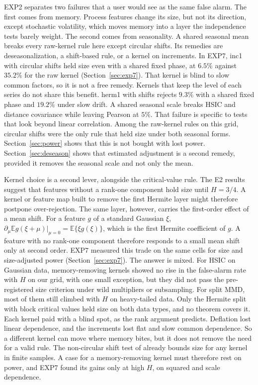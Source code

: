\documentclass[11pt]{article}
\theoremstyle{remark}
\newcommand{\E}{\mathbb E}
\begin{document}
EXP2 separates two failures that a user would see as the same false alarm. The first comes from memory. Process features change its size, but not its direction, except stochastic volatility, which moves memory into a layer the independence tests barely weight. The second comes from seasonality. A shared seasonal mean breaks every raw-kernel rule here except circular shifts. Its remedies are deseasonalization, a shift-based rule, or a kernel on increments. In EXP7, inc1 with circular shifts held size even with a shared fixed phase, at $6.5\%$ against $35.2\%$ for the raw kernel (Section~\ref{sec:exp7}). That kernel is blind to slow common factors, so it is not a free remedy. Kernels that keep the level of each series do not share this benefit. herm1 with shifts rejects $9.3\%$ with a shared fixed phase and $19.2\%$ under slow drift. A shared seasonal scale breaks HSIC and distance covariance while leaving Pearson at $5\%$. That failure is specific to tests that look beyond linear correlation. Among the raw-kernel rules on this grid, circular shifts were the only rule that held size under both seasonal forms. Section~\ref{sec:power} shows that this is not bought with lost power. Section~\ref{sec:deseason} shows that estimated adjustment is a second remedy, provided it removes the seasonal scale and not only the mean.

Kernel choice is a second lever, alongside the critical-value rule. The E2 results suggest that features without a rank-one component hold size until $H=3/4$. A kernel or feature map built to remove the first Hermite layer might therefore postpone over-rejection. The same layer, however, carries the first-order effect of a mean shift. For a feature $g$ of a standard Gaussian $\xi$, $\partial_\mu\E g(\xi+\mu)|_{\mu=0}=\E\{\xi g(\xi)\}$, which is the first Hermite coefficient of $g$. A feature with no rank-one component therefore responds to a small mean shift only at second order. EXP7 measured this trade on the same cells for size and size-adjusted power (Section~\ref{sec:exp7}). The answer is mixed. For HSIC on Gaussian data, memory-removing kernels showed no rise in the false-alarm rate with $H$ on our grid, with one small exception, but they did not pass the pre-registered size criterion under wild multipliers or subsampling. For split MMD, most of them still climbed with $H$ on heavy-tailed data. Only the Hermite split with block critical values held size on both data types, and no theorem covers it. Each kernel paid with a blind spot, as the rank argument predicts. Deflation lost linear dependence, and the increments lost flat and slow common dependence. So a different kernel can move where memory bites, but it does not remove the need for a valid rule. The non-circular shift test of \citet{harris2020shift} already bounds size for any kernel in finite samples. A case for a memory-removing kernel must therefore rest on power, and EXP7 found its gains only at high $H$, on squared and scale dependence.
\end{document}

